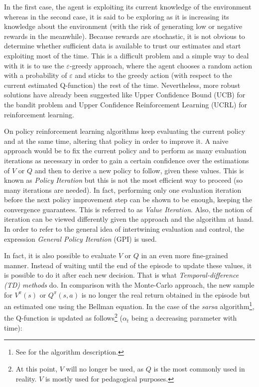 			In the first case, the agent is exploiting its current knowledge of the environment whereas in the second case, it is said to be exploring as it is increasing its knowledge about the environment (with the risk of generating low or negative rewards in the meanwhile). Because rewards are stochastic, it is not obvious to determine whether sufficient data is available to trust our estimates and start exploiting most of the time. This is a difficult problem and a simple way to deal with it is to use the $\varepsilon$-greedy approach, where the agent chooses a random action with a probability of $\varepsilon$ and sticks to the greedy action (with respect to the current estimated Q-function) the rest of the time. Nevertheless, more robust solutions have already been suggested like Upper Confidence Bound (UCB) \cite{Auer2002} for the bandit problem and Upper Confidence Reinforcement Learning (UCRL) \cite{Auer2005} for reinforcement learning.
			
			On policy reinforcement learning algorithms keep evaluating the current policy and at the same time, altering that policy in order to improve it. A naive approach would be to fix the current policy and to perform as many evaluation iterations as necessary in order to gain a certain confidence over the estimations of $V$ or $Q$ and then to derive a new policy to follow, given these values. This is known as \textit{Policy Iteration} but this is not the most efficient way to proceed (so many iterations are needed). In fact, performing only one evaluation iteration before the next policy improvement step can be shown to be enough, keeping the convergence guarantees. This is referred to as \textit{Value Iteration}. Also, the notion of iteration can be viewed differently given the approach and the algorithm at hand. In order to refer to the general idea of intertwining evaluation and control, the expression \textit{General Policy Iteration} (GPI) is used.
			
			In fact, it is also possible to evaluate $V$ or $Q$ in an even more fine-grained manner. Instead of waiting until the end of the episode to update these values, it is possible to do it after each new decision. That is what \textit{Temporal-difference (TD) methods} do. In comparison with the Monte-Carlo approach, the new sample for $V^\pi(s)$ or $Q^\pi(s,a)$ is no longer the real return obtained in the episode but an estimated one using the Bellman equation. In the case of the \textit{sarsa} algorithm\footnote{See \cite{Sutton1998} for the algorithm description.}, the Q-function is updated as follows\footnote{At this point, $V$ will no longer be used, as $Q$ is the most commonly used in reality. $V$ is mostly used for pedagogical purposes.} ($\alpha_t$ being a decreasing parameter with time):
			
